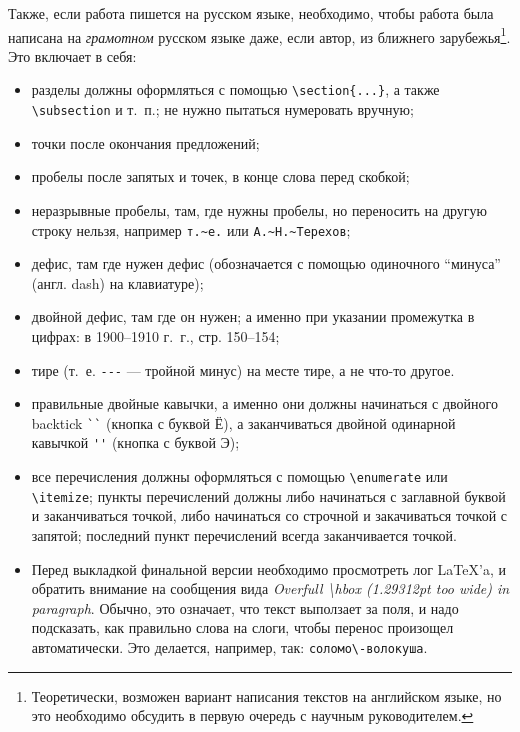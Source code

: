 Также, если работа пишется на русском языке, необходимо, чтобы работа была написана на \textit{грамотном} русском языке даже, если автор, из ближнего зарубежья\footnote{
Теоретически, возможен вариант написания текстов на английском языке, но это необходимо обсудить в первую очередь с научным руководителем.}.
Это включает в себя:
\begin{itemize}
  \item разделы должны оформляться с помощью \verb=\section{...}=, а также \verb=\subsection= и т.~п.; не нужно пытаться нумеровать вручную;
  \item точки после окончания предложений;
  \item пробелы после запятых  и точек, в конце слова перед скобкой;
  \item неразрывные пробелы, там, где нужны пробелы, но переносить на другую строку нельзя, например \verb=т.~е.= или \verb=А.~Н.~Терехов=;
  \item дефис, там где нужен дефис (обозначается с помощью одиночного ``минуса'' (англ. dash) на клавиатуре);
  \item двойной дефис, там где он нужен; а именно  при указании проме\-жутка в цифрах: в 1900--1910 г.~г., стр. 150--154;
  \item тире (т.~е. \verb=---= --- тройной минус) на месте тире, а не что-то другое.
  \item правильные двойные кавычки, а именно они должны начинаться с двойного backtick \verb=``= (кнопка с буквой Ё), а заканчиваться двойной одинарной кавычкой \verb=''= (кнопка с буквой Э);
  \item все перечисления должны оформляться с помощью \verb=\enumerate= или \verb=\itemize=; пункты перечислений должны либо начинаться с заглавной буквой и заканчиваться точкой, либо начинаться со строчной и закачиваться точкой с запятой; последний пункт пере\-числений всегда заканчивается точкой.
  \item Перед выкладкой финальной версии необходимо просмотреть лог \LaTeX'a, и обратить внимание на сообщения вида \emph{Overfull \textbackslash hbox (1.29312pt too wide) in paragraph}. Обычно, это означает, что текст выползает за поля, и надо подсказать, как правильно слова на слоги, чтобы перенос произощел автоматически. Это делается, например, так: \verb=соломо\-волокуша=.
\end{itemize}



